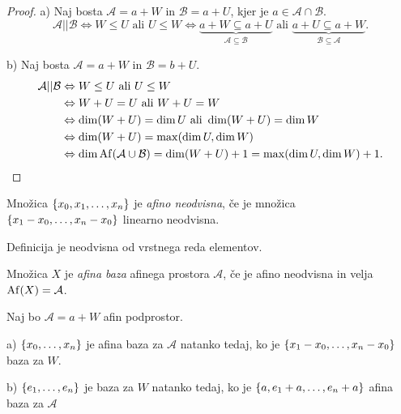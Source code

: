 \begin{proof}
    a) Naj bosta $\mathcal{A} = a + W$ in $\mathcal{B} = a + U$, kjer je $a \in \mathcal{A} \cap \mathcal{B}$.
    \[
    \mathcal{A} || \mathcal{B} \Leftrightarrow W \leq U \text{ ali } U \leq W \Leftrightarrow \underbrace{a + W \subseteq a + U}_{\mathcal{A} \subseteq \mathcal{B}} \text{ ali } \underbrace{a + U \subseteq a + W}_{\mathcal{B} \subseteq \mathcal{A}}.
    \]

    b) Naj bosta $\mathcal{A} = a + W$ in $\mathcal{B} = b + U$.
    \begin{align*}
        \mathcal{A} || \mathcal{B} &\Leftrightarrow W \leq U \text{ ali } U \leq W \\
        &\Leftrightarrow W + U = U \text{ ali } W + U = W \\
        &\Leftrightarrow \dim (W + U) = \dim U \text{ ali } \dim (W + U) = \dim W \\
        &\Leftrightarrow \dim (W + U) = \max (\dim U, \dim W) \\
        &\Leftrightarrow \dim \operatorname{Af} (\mathcal{A} \cup \mathcal{B}) = \dim (W + U) + 1 = \max (\dim U, \dim W) + 1.
    \end{align*}
\end{proof}

\begin{definicija}
    Množica $\left\{x_0, x_1, \dots, x_n\right\}$ je \emph{afino neodvisna}, če je množica \\
    $\left\{x_1 - x_0, \dots, x_n - x_0\right\}$ linearno neodvisna.
\end{definicija}

\begin{opomba}
    Definicija je neodvisna od vrstnega reda elementov.
\end{opomba}

\begin{definicija}
    Množica $X$ je \emph{afina baza} afinega prostora $\mathcal{A}$, če je afino neodvisna in velja $\operatorname{Af} (X) = \mathcal{A}$.
\end{definicija}

\begin{izrek}
    Naj bo $\mathcal{A} = a + W$ afin podprostor.

    a) $\left\{x_0, \dots, x_n\right\}$ je afina baza za $\mathcal{A}$ natanko tedaj, ko je $\left\{x_1 - x_0, \dots, x_n - x_0\right\}$ baza za $W$.

    b) $\left\{e_1, \dots, e_n\right\}$ je baza za $W$ natanko tedaj, ko je $\left\{a, e_1 + a, \dots, e_n + a\right\}$ afina baza za $\mathcal{A}$
\end{izrek}


